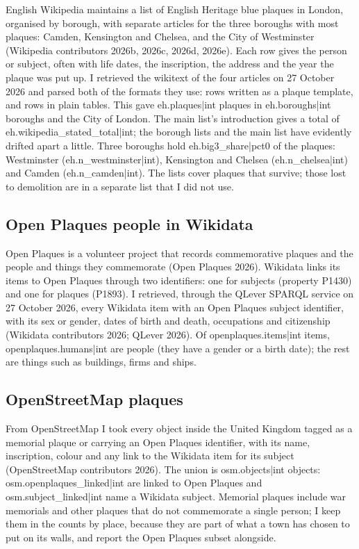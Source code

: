 \documentclass[11pt,a4paper]{article}
\begin{document}
English Wikipedia maintains a list of English Heritage blue plaques in London, organised by borough, with separate articles for the three boroughs with most plaques: Camden, Kensington and Chelsea, and the City of Westminster (Wikipedia contributors 2026b, 2026c, 2026d, 2026e). Each row gives the person or subject, often with life dates, the inscription, the address and the year the plaque was put up. I retrieved the wikitext of the four articles on 27 October 2026 and parsed both of the formats they use: rows written as a plaque template, and rows in plain tables. This gave {{eh.plaques|int}} plaques in {{eh.boroughs|int}} boroughs and the City of London. The main list's introduction gives a total of {{eh.wikipedia_stated_total|int}}; the borough lists and the main list have evidently drifted apart a little. Three boroughs hold {{eh.big3_share|pct0}} of the plaques: Westminster ({{eh.n_westminster|int}}), Kensington and Chelsea ({{eh.n_chelsea|int}}) and Camden ({{eh.n_camden|int}}). The lists cover plaques that survive; those lost to demolition are in a separate list that I did not use.

\subsection{Open Plaques people in Wikidata}

Open Plaques is a volunteer project that records commemorative plaques and the people and things they commemorate (Open Plaques 2026). Wikidata links its items to Open Plaques through two identifiers: one for subjects (property P1430) and one for plaques (P1893). I retrieved, through the QLever SPARQL service on 27 October 2026, every Wikidata item with an Open Plaques subject identifier, with its sex or gender, dates of birth and death, occupations and citizenship (Wikidata contributors 2026; QLever 2026). Of {{openplaques.items|int}} items, {{openplaques.humans|int}} are people (they have a gender or a birth date); the rest are things such as buildings, firms and ships.

\subsection{OpenStreetMap plaques}

From OpenStreetMap I took every object inside the United Kingdom tagged as a memorial plaque or carrying an Open Plaques identifier, with its name, inscription, colour and any link to the Wikidata item for its subject (OpenStreetMap contributors 2026). The union is {{osm.objects|int}} objects: {{osm.openplaques_linked|int}} are linked to Open Plaques and {{osm.subject_linked|int}} name a Wikidata subject. Memorial plaques include war memorials and other plaques that do not commemorate a single person; I keep them in the counts by place, because they are part of what a town has chosen to put on its walls, and report the Open Plaques subset alongside.
\end{document}
